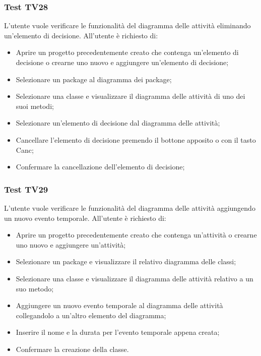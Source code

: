 \documentclass[../PianoDiQualifica.tex]{subfiles}
\begin{document}
	
	\subsubsection{Test TV28} 
	L'utente vuole verificare le funzionalità del diagramma delle attività eliminando un'elemento di decisione. 
	All'utente è richiesto di: 
	\begin{itemize} 
		\item Aprire un progetto precedentemente creato che contenga un'elemento di decisione o crearne uno nuovo e aggiungere un'elemento di decisione;
		\item Selezionare un package al diagramma dei package; 
		\item Selezionare una classe e visualizzare il diagramma delle attività di uno dei suoi metodi; 
		\item Selezionare un'elemento di decisione dal diagramma delle attività; 
		\item Cancellare l'elemento di decisione premendo il bottone apposito o con il tasto Canc; 
		\item Confermare la cancellazione dell'elemento di decisione;%
	\end{itemize} 	
	
	\subsubsection{Test TV29} 
	L'utente vuole verificare le funzionalità del diagramma delle attività aggiungendo un nuovo evento temporale. 
	All'utente è richiesto di: 
	\begin{itemize} 
		\item Aprire un progetto precedentemente creato che contenga un'attività o crearne uno nuovo e aggiungere un'attività;
		\item Selezionare un package e visualizzare il relativo diagramma delle classi; 
		\item Selezionare una classe e visualizzare il diagramma delle attività relativo a un suo metodo; %
		\item Aggiungere un nuovo evento temporale al diagramma delle attività collegandolo a un'altro elemento del diagramma; 
		\item Inserire il nome e la durata per l'evento temporale appena creata; %
		\item Confermare la creazione della classe. 
	\end{itemize} 
	
\end{document}
